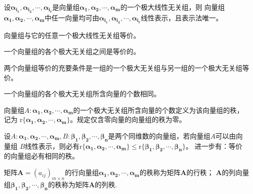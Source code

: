 \begin{theorem}
    设$\boldsymbol{\alpha_{i_1}},\boldsymbol{\alpha_{i_2}},\cdots,\boldsymbol{\alpha_{i_r}}$是向量组$\boldsymbol{\alpha_1},\boldsymbol{\alpha_2},\cdots,\boldsymbol{\alpha_m}$的一个极大线性无关组，则
    向量组$\boldsymbol{\alpha_1},\boldsymbol{\alpha_2},\cdots,\boldsymbol{\alpha_m}$中任一向量均可由$\boldsymbol{\alpha_{i_1}},\boldsymbol{\alpha_{i_2}},\cdots,\boldsymbol{\alpha_{i_r}}$线性表示，且表示法唯一。
\end{theorem}

\begin{theorem}
    向量组与它的任意一个极大线性无关组等价。
\end{theorem}

\begin{theorem}
    一个向量组的各个极大无关组之间是等价的。
\end{theorem}

\begin{theorem}
    两个向量组等价的充要条件是一组的一个极大无关组与另一组的一个极大无关组等价。
\end{theorem}

\begin{theorem}
    一个向量组的各个极大无关组所含向量的个数相同。
\end{theorem}

\begin{definition}[向量组的秩]
    向量组$A:\boldsymbol{\alpha_1},\boldsymbol{\alpha_2},\cdots,\boldsymbol{\alpha_m}$的一个极大无关组所含向量的个数定义为该{\heiti 向量组的秩}，记为
    $\mathrm{r}\{\boldsymbol{\alpha_1},\boldsymbol{\alpha_2},\cdots,\boldsymbol{\alpha_m}\}$。规定仅含零向量的向量组的秩为零。
\end{definition}

\begin{definition}
    设$A:\boldsymbol{\alpha_1},\boldsymbol{\alpha_2},\cdots,\boldsymbol{\alpha_m},B:\boldsymbol{\beta_1},\boldsymbol{\beta_2},\cdots,\boldsymbol{\beta_n}$是两个同维数的向量组，若向量组$A$可以由向量组
    $B$线性表示，则必有$\mathrm{r}\{\boldsymbol{\alpha_1},\boldsymbol{\alpha_2},\cdots,\boldsymbol{\alpha_m}\}\leq \mathrm{r}\{\boldsymbol{\beta_1},\boldsymbol{\beta_2},\cdots,\boldsymbol{\beta_n}\}$。
    进一步有：等价的向量组必有相同的秩。
\end{definition}

\begin{definition}
    矩阵$\boldsymbol{A}={(a_{ij})}_{m\times n}$的行向量组$\boldsymbol{\alpha_1},\boldsymbol{\alpha_2},\cdots,\boldsymbol{\alpha_m}$的秩称为矩阵$\boldsymbol{A}$的{\heiti 行秩}；
    $\boldsymbol{A}$的列向量组$\boldsymbol{\beta_1},\boldsymbol{\beta_2},\cdots,\boldsymbol{\beta_n}$的秩称为矩阵$\boldsymbol{A}$的{\heiti 列秩}.
\end{definition}

